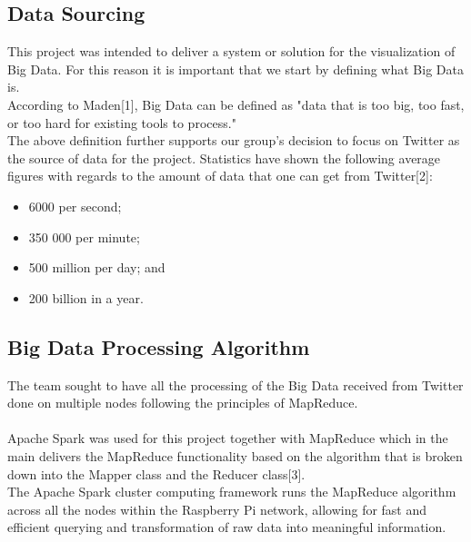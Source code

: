 \documentclass[12pt]{article} %
\begin{document}
	\subsection {Data Sourcing}
	
	This project was intended to deliver a system or solution for the visualization of Big Data. For this reason it is important that we start by defining what Big Data is.
	\\
	According to Maden[1], Big Data can be defined as "data that is too big, too fast, or too hard for existing tools to process."
	\\
	The above definition further supports our group's decision to focus on Twitter as the source of data for the project. Statistics have shown the following average figures with regards to the amount of data that one can get from Twitter[2]:
	\\
	
		\begin{itemize}
			\item 6000 per second; 
			\item 350 000 per minute;
			\item 500 million per day; and
			\item 200 billion in a year.
		\end{itemize}
	
	\subsection {Big Data Processing Algorithm}
	
	The team sought to have all the processing of the Big Data received from Twitter done on multiple nodes following the principles of MapReduce.
	\\
	\\
	Apache Spark was used for this project together with MapReduce which in the main delivers the MapReduce functionality based on the algorithm that is broken down into the Mapper class and the Reducer class[3].\\
	
	The Apache Spark cluster computing framework runs the MapReduce algorithm across all the nodes within the Raspberry Pi network, allowing for fast and efficient querying and transformation of raw data into meaningful information.\\
	\\
	
	

	
\end{document}
